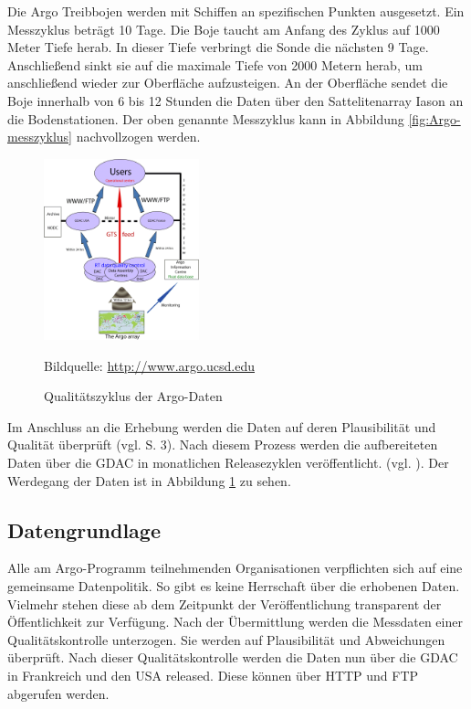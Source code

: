     Die Argo Treibbojen werden mit Schiffen an spezifischen Punkten ausgesetzt. Ein Messzyklus beträgt 10 Tage. Die Boje taucht am Anfang des Zyklus auf 1000 Meter Tiefe herab.  In dieser Tiefe verbringt die Sonde die nächsten 9 Tage. Anschließend sinkt sie auf die maximale Tiefe von 2000 Metern herab, um anschließend wieder zur Oberfläche aufzusteigen. An der Oberfläche sendet die Boje innerhalb von 6 bis 12 Stunden die Daten über den Sattelitenarray Iason an die Bodenstationen. Der oben genannte Messzyklus kann in Abbildung \ref{fig:Argo-messzyklus} nachvollzogen werden.

    \begin{figure}[!ht]
        \centering
        \includegraphics[width=0.4\textwidth]{pix/RT-Data-flow}
        \caption[Qualitätszyklus der Argo-Daten]{Qualitätszyklus der Argo-Daten}
        \footnotesize{
            Bildquelle: \href{http://www.argo.ucsd.edu/Argo_data_and.html}%
                        {\url{http://www.argo.ucsd.edu}}
        }


        \label{fig:argo_dataflow}
    \end{figure}

    Im Anschluss an die Erhebung werden die Daten auf deren Plausibilität und Qualität überprüft (vgl. \cite{ArgoDataBeginnersGuide} S. 3). Nach diesem Prozess werden die aufbereiteten Daten über die \gls{GDAC} in monatlichen Releasezyklen veröffentlicht. (vgl. \cite{Argofloa92:online}). Der Werdegang der Daten ist in Abbildung \ref{fig:argo_dataflow} zu sehen.

\subsection{Datengrundlage}


    Alle am Argo-Programm teilnehmenden Organisationen verpflichten sich auf eine gemeinsame Datenpolitik. So gibt es keine Herrschaft über die erhobenen Daten. Vielmehr stehen diese ab dem Zeitpunkt der Veröffentlichung transparent der Öffentlichkeit zur Verfügung.
    Nach der Übermittlung werden die Messdaten einer Qualitätskontrolle unterzogen. Sie werden auf Plausibilität und Abweichungen überprüft. Nach dieser Qualitätskontrolle werden die Daten nun über die \gls{GDAC} in Frankreich und den USA released. Diese können über \gls{HTTP} und \gls{FTP} abgerufen werden.

